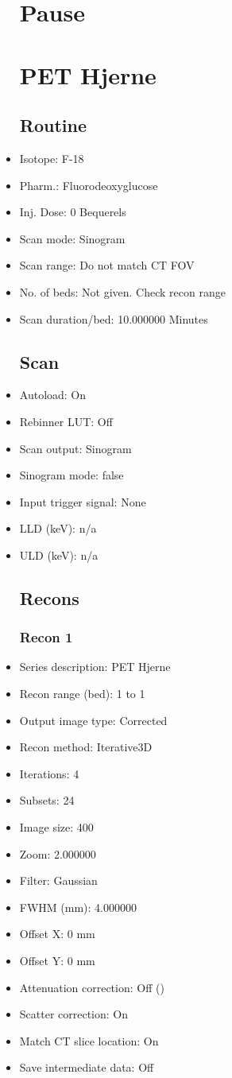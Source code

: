 \documentclass[12pt]{article}
\begin{document}
\begin{itemize}[noitemsep]
\section{Pause}
\section{PET Hjerne}\subsection{Routine}
\item Isotope: F-18
\item Pharm.: Fluorodeoxyglucose
\item Inj. Dose: 0 Bequerels
\item Scan mode: Sinogram
\item Scan range: Do not match CT FOV
\item No. of beds: Not given. Check recon range
\item Scan duration/bed: 10.000000 Minutes
\subsection{Scan}
\item Autoload: On
\item Rebinner LUT: Off
\item Scan output: Sinogram
\item Sinogram mode: false
\item Input trigger signal: None
\item LLD (keV): n/a
\item ULD (keV): n/a
\subsection{Recons}
\subsubsection{Recon 1}
\item Series description: PET Hjerne
\item Recon range (bed): 1 to 1
\item Output image type: Corrected
\item Recon method: Iterative3D
\item Iterations: 4
\item Subsets: 24
\item Image size: 400
\item Zoom: 2.000000
\item Filter: Gaussian
\item FWHM (mm): 4.000000
\item Offset X: 0 mm
\item Offset Y: 0 mm
\item Attenuation correction: Off ()
\item Scatter correction: On
\item Match CT slice location: On
\item Save intermediate data: Off
\end{itemize}
\end{document}
